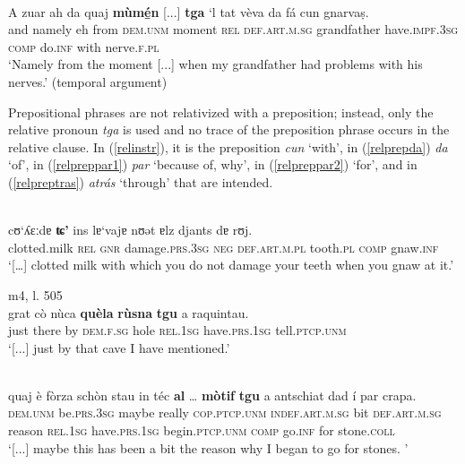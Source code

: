 \ea
{}\\
\gll A zuar ah da quaj \textbf{mùmé̱n} [...] \textbf{tga} `l tat vèva da fá cun gnarvaṣ. \\
and namely eh from \textsc{dem.unm} moment {} \textsc{rel} \textsc{def.art.m.sg} grandfather have.\textsc{impf.3sg} \textsc{comp} do.\textsc{inf} with nerve.\textsc{f.pl} \\ 
\glt `Namely from the moment [...] when my grandfather had problems with his nerves.' (temporal argument)
\z

Prepositional phrases are not relativized with a preposition; instead, only the relative pronoun \textit{tga} is used and no trace of the preposition phrase occurs in the relative clause. In (\ref{relinstr}), it is the preposition \textit{cun} `with', in (\ref{relprepda}) \textit{da} `of', in (\ref{relpreppar1}) \textit{par} `because of, why', in (\ref{relpreppar2}) `for', and in (\ref{relpreptras}) \textit{atrás} `through' that are intended.

\ea\label{relinstr}
\\
\gll    […] cʊ‘ʎɛːdɐ \textbf{ʨ'} ins lɐ‘vajɐ nʊǝt ɐlz djants dɐ rʊj.\\
{} clotted.milk \textsc{rel} \textsc{gnr} damage.\textsc{prs.3sg} \textsc{neg} \textsc{def.art.m.pl} tooth.\textsc{pl} \textsc{comp} gnaw.\textsc{inf} \\
\glt `[…] clotted milk with which you do not damage your teeth when you gnaw at it.'
\z

\ea\label{relprepda}
 {m4, l. 505}\\
\gll [...] grat cò nùca \textbf{quèla} \textbf{rùsna} \textbf{tgu} a raquintau.\\
{} just there by \textsc{dem.f.sg} hole \textsc{rel.1sg} have.\textsc{prs.1sg} tell.\textsc{ptcp.unm}\\  
\glt `[...] just by that cave I have mentioned.'
\z

\ea\label{relpreppar1}
\\
\gll  [...] quaj è fòrza schòn stau in téc \textbf{al} … \textbf{mòtif} \textbf{tgu} a antschiat dad í par crapa.\\
{} \textsc{dem.unm} be.\textsc{prs.3sg} maybe really  \textsc{cop.ptcp.unm} \textsc{indef.art.m.sg} bit \textsc{def.art.m.sg} {} reason \textsc{rel.1sg} have.\textsc{prs.1sg} begin.\textsc{ptcp.unm} \textsc{comp} go.\textsc{inf} for stone.\textsc{coll}\\
\glt `[...] maybe this has been a bit the reason why I began to go for stones. '
\z

